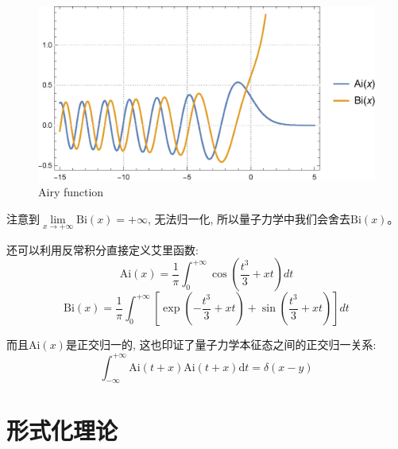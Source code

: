 \documentclass[a4paper,zihao=-4,linespread=1]{ctexrep}
\begin{document}
    \begin{figure}[htbp]
        \centering
        \includegraphics[scale=0.85]{fig/2-7-1.eps}
        \caption{Airy function}
    \end{figure}
    注意到$\lim\limits_{x\to +\infty}\mathrm{Bi}(x)=+\infty$, 无法归一化, 所以量子力学中我们会舍去$\mathrm{Bi}(x)$。

    还可以利用反常积分直接定义艾里函数:
    \begin{equation*}
        \mathrm{Ai}(x)=\frac{1}{\pi}\int_{0}^{+\infty}\cos\left(\frac{t^3}{3}+xt\right)dt
    \end{equation*}
    \begin{equation*}
        \mathrm{Bi}(x)=\frac{1}{\pi}\int_{0}^{+\infty}\left[\exp\left(-\frac{t^3}{3}+xt\right)+\sin\left(\frac{t^3}{3}+xt\right)\right]dt
    \end{equation*}
    
    而且$\mathrm{Ai}(x)$是正交归一的, 这也印证了量子力学本征态之间的正交归一关系:
    \begin{equation*}
        \int_{-\infty}^{+\infty}\mathrm{Ai}(t+x)\mathrm{Ai}(t+x)\mathrm{d}t=\delta(x-y)
    \end{equation*}
    \chapter{形式化理论}
\end{document}
